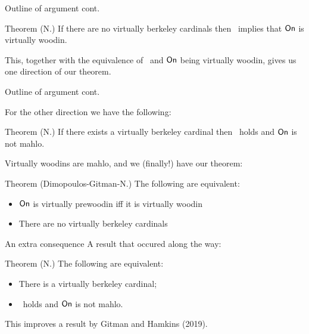 \begin{frame}{Outline of argument cont.}
  \begin{block}{Theorem (N.)}
    If there are no virtually berkeley cardinals then \gvp\ implies that $\textsf{On}$ is virtually woodin.
  \end{block}

  \pause

  This, together with the equivalence of \gvp\ and $\textsf{On}$ being virtually woodin, gives us one direction of our theorem.
\end{frame}

\begin{frame}{Outline of argument cont.}

  For the other direction we have the following:

  \begin{block}{Theorem (N.)}
    If there exists a virtually berkeley cardinal then \gvp\ holds and $\textsf{On}$ is not mahlo.
  \end{block}

  \pause

  Virtually woodins are mahlo, and we (finally!) have our theorem:

  \begin{block}{Theorem (Dimopoulos-Gitman-N.)}
    The following are equivalent:
    \begin{itemize}
      \item $\textsf{On}$ is virtually prewoodin iff it is virtually woodin
      \item There are no virtually berkeley cardinals
    \end{itemize}
  \end{block}
\end{frame}

\begin{frame}{An extra consequence}
  A result that occured along the way:

  \begin{block}{Theorem (N.)}
    The following are equivalent:
    \begin{itemize}
      \item There is a virtually berkeley cardinal;
      \item \gvp\ holds and $\textsf{On}$ is not mahlo.
    \end{itemize}
  \end{block}

  \pause

  This improves a result by Gitman and Hamkins (2019).
\end{frame}

